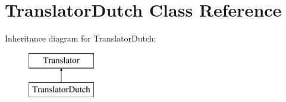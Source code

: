 \hypertarget{class_translator_dutch}{}\section{Translator\+Dutch Class Reference}
\label{class_translator_dutch}
Inheritance diagram for Translator\+Dutch\+:\begin{figure}[H]
\begin{center}
\leavevmode
\includegraphics[height=2.000000cm]{class_translator_dutch}
\end{center}
\end{figure}
